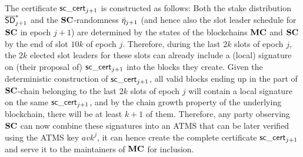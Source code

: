 The certificate $\mathsf{sc\_cert}_{j+1}$ is constructed as follows:
Both the stake distribution
$\mathsf{\overline{SD}}^*_{j+1}$ and the $\mathbf{SC}$-randomness $\bar{\eta}_{j+1}$ (and hence also the slot leader
schedule for $\mathbf{SC}$ in epoch $j+1$)
are determined by the states of
the blockchains $\mathbf{MC}$ and $\mathbf{SC}$ by the end of slot $10k$ of epoch $j$.
Therefore, during the last $2k$ slots of epoch $j$, the $2k$ elected slot
leaders for these slots can already include a (local) signature on (their
proposal of) $\mathsf{sc\_cert}_{j+1}$ into the blocks they create. Given the
deterministic construction of $\mathsf{sc\_cert}_{j+1}$, all valid blocks ending up in
the part of $\mathbf{SC}$-chain belonging to the last $2k$ slots of epoch $j$ will
contain a local signature on the same $\mathsf{sc\_cert}_{j+1}$,
and by the chain growth
property of the underlying blockchain, there will be at least $k+1$ of them.
Therefore, any party
observing $\mathbf{SC}$ can now combine these signatures into an ATMS that can be later
verified using the ATMS key $avk^j$, it can hence create the complete certificate
$\mathsf{sc\_cert}_{j+1}$ and serve it to the maintainers of $\mathbf{MC}$ for inclusion.





